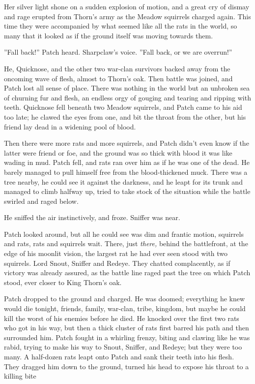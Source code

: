 \documentclass[12pt]{book}
\begin{document}
Her silver light shone on a sudden explosion of motion, and a great cry of dismay and rage erupted from Thorn's army as the Meadow squirrels charged again. This time they were accompanied by what seemed like all the rats in the world, so many that it looked as if the ground itself was moving towards them.\par
 ''Fall back!'' Patch heard. Sharpclaw's voice. ''Fall back, or we are overrun!''\par
 He, Quicknose, and the other two war-clan survivors backed away from the oncoming wave of flesh, almost to Thorn's oak. Then battle was joined, and Patch lost all sense of place. There was nothing in the world but an unbroken sea of churning fur and flesh, an endless orgy of gouging and tearing and ripping with teeth. Quicknose fell beneath two Meadow squirrels, and Patch came to his aid too late; he clawed the eyes from one, and bit the throat from the other, but his friend lay dead in a widening pool of blood.\par
Then there were more rats and more squirrels, and Patch didn't even know if the latter were friend or foe, and the ground was so thick with blood it was like wading in mud. Patch fell, and rats ran over him as if he was one of the dead. He barely managed to pull himself free from the blood-thickened muck. There was a tree nearby, he could see it against the darkness, and he leapt for its trunk and managed to climb halfway up, tried to take stock of the situation while the battle swirled and raged below.\par
He sniffed the air instinctively, and froze. Sniffer was near.\par
 Patch looked around, but all he could see was dim and frantic motion, squirrels and rats, rats and squirrels %
 wait. There, just {\it there,} behind the battlefront, at the edge of his moonlit vision, the largest rat he had ever seen stood with two squirrels. Lord Snout, Sniffer and Redeye. They chatted complacently, as if victory was already assured, as the battle line raged past the tree on which Patch stood, ever closer to King Thorn's oak.\par
 Patch dropped to the ground and charged. He was doomed; everything he knew would die tonight, friends, family, war-clan, tribe, kingdom, but maybe he could kill the worst of his enemies before he died. He knocked over the first two rats who got in his way, but then a thick cluster of rats first barred his path and then surrounded him. Patch fought in a whirling frenzy, biting and clawing like he was rabid, trying to make his way to Snout, Sniffer, and Redeye; but they were too many. A half-dozen rats leapt onto Patch and sank their teeth into his flesh. They dragged him down to the ground, turned his head to expose his throat to a killing bite %
\end{document}
